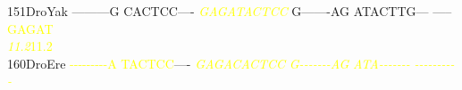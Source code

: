 \documentclass[11pt,twoside,reqno,a4paper]{article}
\begin{document}
{151\hspace*{1\charwidth}DroYak	---------G	CACTCC----	\textit{\textcolor{yellow}{G}}\textit{\textcolor{yellow}{A}}\textit{\textcolor{yellow}{G}}\textit{\textcolor{yellow}{A}}\textit{\textcolor{yellow}{T}}\textit{\textcolor{yellow}{A}}\textit{\textcolor{yellow}{C}}\textit{\textcolor{yellow}{T}}\textit{\textcolor{yellow}{C}}\textit{\textcolor{yellow}{C}}	G-------AG	ATACTTG---	-----\textcolor{yellow}{G}\textcolor{yellow}{A}\textcolor{yellow}{G}\textcolor{yellow}{A}\textcolor{yellow}{T}	\\
\hspace*{4\charwidth}\hspace*{7\charwidth}\hspace*{1\charwidth}\hspace*{1\charwidth}\hspace*{20\charwidth}\textit{\textcolor{yellow}{11.2}}\hspace*{1\charwidth}\hspace*{1\charwidth}\hspace*{1\charwidth}\hspace*{31\charwidth}\textcolor{yellow}{11.2}\hspace*{1\charwidth}\\
160\hspace*{1\charwidth}DroEre	\textcolor{yellow}{-}\textcolor{yellow}{-}\textcolor{yellow}{-}\textcolor{yellow}{-}\textcolor{yellow}{-}\textcolor{yellow}{-}\textcolor{yellow}{-}\textcolor{yellow}{-}\textcolor{yellow}{-}\textcolor{yellow}{A}	\textcolor{yellow}{T}\textcolor{yellow}{A}\textcolor{yellow}{C}\textcolor{yellow}{T}\textcolor{yellow}{C}\textcolor{yellow}{C}----	\textit{\textcolor{yellow}{G}}\textit{\textcolor{yellow}{A}}\textit{\textcolor{yellow}{G}}\textit{\textcolor{yellow}{A}}\textit{\textcolor{yellow}{C}}\textit{\textcolor{yellow}{A}}\textit{\textcolor{yellow}{C}}\textit{\textcolor{yellow}{T}}\textit{\textcolor{yellow}{C}}\textit{\textcolor{yellow}{C}}	\textit{\textcolor{yellow}{G}}\textit{\textcolor{yellow}{-}}\textit{\textcolor{yellow}{-}}\textit{\textcolor{yellow}{-}}\textit{\textcolor{yellow}{-}}\textit{\textcolor{yellow}{-}}\textit{\textcolor{yellow}{-}}\textit{\textcolor{yellow}{-}}\textit{\textcolor{yellow}{A}}\textit{\textcolor{yellow}{G}}	\textit{\textcolor{yellow}{A}}\textit{\textcolor{yellow}{T}}\textit{\textcolor{yellow}{A}}\textit{\textcolor{yellow}{-}}\textit{\textcolor{yellow}{-}}\textit{\textcolor{yellow}{-}}\textit{\textcolor{yellow}{-}}\textit{\textcolor{yellow}{-}}\textit{\textcolor{yellow}{-}}\textit{\textcolor{yellow}{-}}	\textit{\textcolor{yellow}{-}}\textit{\textcolor{yellow}{-}}\textit{\textcolor{yellow}{-}}\textit{\textcolor{yellow}{-}}\textit{\textcolor{yellow}{-}}\textit{\textcolor{yellow}{-}}\textit{\textcolor{yellow}{-}}\textit{\textcolor{yellow}{-}}\textit{\textcolor{yellow}{-}}\textit{\textcolor{yellow}{-}}	\\
}
\end{document}
